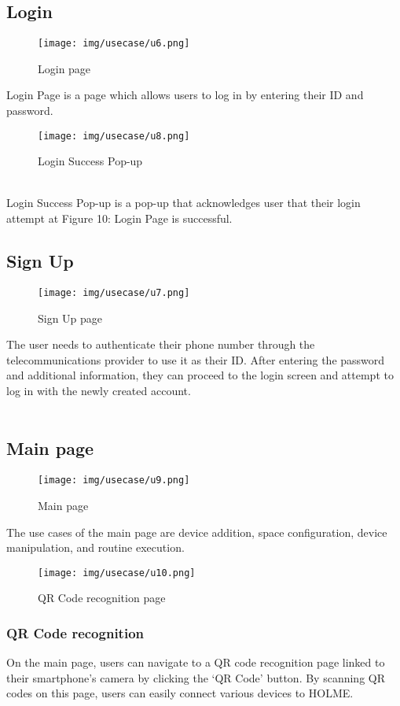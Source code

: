 \documentclass[conference]{IEEEtran}
\begin{document}
\subsection{Login}
\begin{figure}[h]
\centering
\texttt{[image: img/usecase/u6.png]}
\caption{Login page}
\end{figure}
Login Page is a page which allows users to log in by entering their ID and password.\\
\vspace{2cm}
\begin{figure}[h]
\centering
\texttt{[image: img/usecase/u8.png]}
\caption{Login Success Pop-up}
\end{figure}
\\
Login Success Pop-up is a pop-up that
acknowledges user that their login attempt at Figure 10:
Login Page is successful.
\clearpage

\subsection{Sign Up}
\begin{figure}[h]
\centering
\texttt{[image: img/usecase/u7.png]}
\caption{Sign Up page}
\end{figure}
The user needs to authenticate their phone number through the telecommunications provider to use it as their ID. After entering the password and additional information, they can proceed to the login screen and attempt to log in with the newly created account.\\\\

\subsection{Main page}
\begin{figure}[h]
\centering
\texttt{[image: img/usecase/u9.png]}
\caption{Main page}
\end{figure}
The use cases of the main page are device addition, space configuration, device manipulation, and routine execution. 
\vspace{2cm}

\begin{figure}[h!]
\centering
\texttt{[image: img/usecase/u10.png]}
\caption{QR Code recognition page}
\end{figure}
\subsubsection{QR Code recognition}
On the main page, users can navigate to a QR code recognition page linked to their smartphone's camera by clicking the `QR Code' button. By scanning QR codes on this page, users can easily connect various devices to HOLME.
\vspace{2cm}
\end{document}
